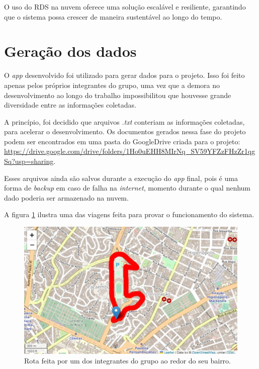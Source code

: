 
O uso do RDS na nuvem oferece uma solução escalável e resiliente, garantindo que o sistema possa crescer de maneira sustentável ao longo do tempo.

\section{Geração dos dados}
O \textit{app} desenvolvido foi utilizado para gerar dados para o projeto. Isso foi feito apenas pelos próprios integrantes do grupo, uma vez que a demora no desenvolvimento ao longo do trabalho impossibilitou que houvesse grande diversidade entre as informações coletadas.

A princípio, foi decidido que arquivos \textit{.txt} conteriam as informações coletadas, para acelerar o desenvolvimento. Os documentos gerados nessa fase do projeto podem ser encontrados em uma pasta do GoogleDrive criada para o projeto: \url{https://drive.google.com/drive/folders/1Ho0uEHH8MIrNq_SV59YFZzFHzZr1qgSq?usp=sharing}.

Esses arquivos ainda são salvos durante a execução do \textit{app} final, pois é uma forma de \textit{backup} em caso de falha na \textit{internet}, momento durante o qual nenhum dado poderia ser armazenado na nuvem.

A figura \ref{fig:rota} ilustra uma das viagens feita para provar o funcionamento do sistema.

\begin{figure}[hp]
    \centering
    
    \includegraphics[scale=0.6]{figures/rota.png}
    
    \caption{Rota feita por um dos integrantes do grupo ao redor do seu bairro.}
    
    \label{fig:rota}
\end{figure}

